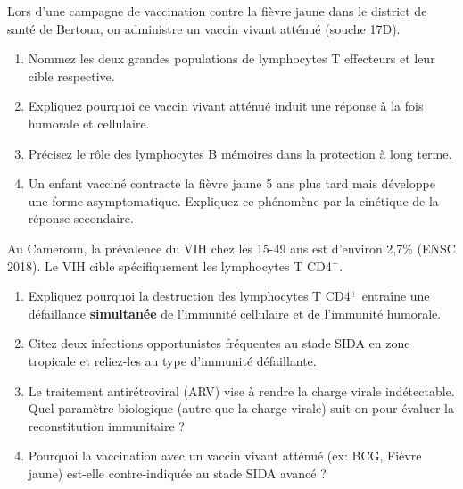 \documentclass[11pt]{article}
\begin{document}
\begin{exercice}
Lors d'une campagne de vaccination contre la fièvre jaune dans le district de santé de Bertoua, on administre un vaccin vivant atténué (souche 17D).
\begin{enumerate}
    \item Nommez les deux grandes populations de lymphocytes T effecteurs et leur cible respective.
    \item Expliquez pourquoi ce vaccin vivant atténué induit une réponse à la fois humorale et cellulaire.
    \item Précisez le rôle des lymphocytes B mémoires dans la protection à long terme.
    \item Un enfant vacciné contracte la fièvre jaune 5 ans plus tard mais développe une forme asymptomatique. Expliquez ce phénomène par la cinétique de la réponse secondaire.
\end{enumerate}
\end{exercice}

\begin{exercice}
Au Cameroun, la prévalence du VIH chez les 15-49 ans est d'environ 2,7\% (ENSC 2018). Le VIH cible spécifiquement les lymphocytes T CD4$^+$.
\begin{enumerate}
    \item Expliquez pourquoi la destruction des lymphocytes T CD4$^+$ entraîne une défaillance \textbf{simultanée} de l'immunité cellulaire et de l'immunité humorale.
    \item Citez deux infections opportunistes fréquentes au stade SIDA en zone tropicale et reliez-les au type d'immunité défaillante.
    \item Le traitement antirétroviral (ARV) vise à rendre la charge virale indétectable. Quel paramètre biologique (autre que la charge virale) suit-on pour évaluer la reconstitution immunitaire ?
    \item Pourquoi la vaccination avec un vaccin vivant atténué (ex: BCG, Fièvre jaune) est-elle contre-indiquée au stade SIDA avancé ?
\end{enumerate}
\end{exercice}
\end{document}
